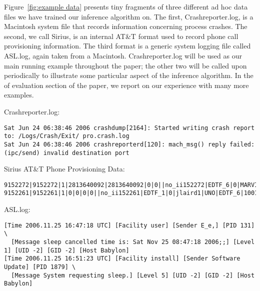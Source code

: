Figure~\ref{fig:example data} presents tiny fragments of three
different ad hoc data files we have trained our inference algorithm
on.  The first, Crashreporter.log, is a Macintosh
system file that records information concerning process crashes. The
second, we call Sirius, is an internal AT\&T format used to
record phone call provisioning information. The third format is
a generic system logging file called ASL.log, again taken from a
Macintosh.
Crashreporter.log will be used as our main running example throughout the
paper; the other two will be called upon periodically to illustrate
some particular aspect of the inference algorithm.  In the 
of evaluation section of the paper, we report on our experience
with many more examples.

\begin{figure*}
Crashreporter.log:
{\small \begin{verbatim}
Sat Jun 24 06:38:46 2006 crashdump[2164]: Started writing crash report to: /Logs/Crash/Exit/ pro.crash.log
Sat Jun 24 06:38:46 2006 crashreporterd[120]: mach_msg() reply failed: (ipc/send) invalid destination port
\end{verbatim}
}

Sirius AT\&T Phone Provisioning Data:
{\small \begin{verbatim}
9152272|9152272|1|2813640092|2813640092|0|0||no_ii152272|EDTF_6|0|MARVINS1|UNO|10|1000295291
9152261|9152261|1|0|0|0|0||no_ii152261|EDTF_1|0|jlaird1|UNO|EDTF_6|1001390400|EDTF_OS_10|1001476801
\end{verbatim}
}

ASL.log:
{\small  \begin{verbatim}
[Time 2006.11.25 16:47:18 UTC] [Facility user] [Sender E_e,] [PID 131] \
  [Message sleep cancelled time is: Sat Nov 25 08:47:18 2006;;] [Level 1] [UID -2] [GID -2] [Host Babylon]
[Time 2006.11.25 16:51:23 UTC] [Facility install] [Sender Software Update] [PID 1879] \
  [Message System requesting sleep.] [Level 5] [UID -2] [GID -2] [Host Babylon]
\end{verbatim}
}


\caption {Example data. 
Data records too long to be formatted on a single line are terminated with '\' and indented two spaces on the next line.}
\label{fig:example data}
\end{figure*}

